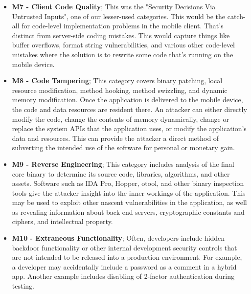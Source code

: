 \begin{itemize}
		\item \textbf{M7 - Client Code Quality}; This was the "Security Decisions Via Untrusted Inputs", one of our lesser-used categories. This would be the catch-all for code-level implementation problems in the mobile client. That's distinct from server-side coding mistakes. This would capture things like buffer overflows, format string vulnerabilities, and various other code-level mistakes where the solution is to rewrite some code that's running on the mobile device.
		\item \textbf{M8 - Code Tampering}; This category covers binary patching, local resource modification, method hooking, method swizzling, and dynamic memory modification. Once the application is delivered to the mobile device, the code and data resources are resident there. An attacker can either directly modify the code, change the contents of memory dynamically, change or replace the system APIs that the application uses, or modify the application's data and resources. This can provide the attacker a direct method of subverting the intended use of the software for personal or monetary gain.
		\item \textbf{M9 - Reverse Engineering}; This category includes analysis of the final core binary to determine its source code, libraries, algorithms, and other assets. Software such as IDA Pro, Hopper, otool, and other binary inspection tools give the attacker insight into the inner workings of the application. This may be used to exploit other nascent vulnerabilities in the application, as well as revealing information about back end servers, cryptographic constants and ciphers, and intellectual property.
		\item \textbf{M10 - Extraneous Functionality}; Often, developers include hidden backdoor functionality or other internal development security controls that are not intended to be released into a production environment. For example, a developer may accidentally include a password as a comment in a hybrid app. Another example includes disabling of 2-factor authentication during testing.
	\end{itemize} 